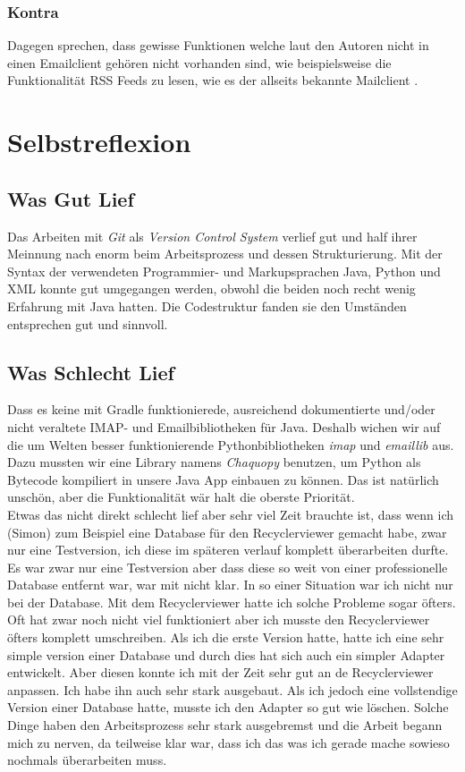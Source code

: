 \documentclass[a4paper,11pt]{article}
\begin{document}
\subsubsection{Kontra}
Dagegen sprechen, dass gewisse Funktionen welche laut den Autoren nicht in einen Emailclient gehören nicht vorhanden sind, wie beispielsweise die Funktionalität RSS Feeds zu lesen, wie es der allseits bekannte Mailclient \cite{thunderbird}.

\section{Selbstreflexion}

\subsection{Was Gut Lief}
Das Arbeiten mit \textit{Git} als \textit{Version Control System} verlief gut und half ihrer Meinnung nach enorm beim Arbeitsprozess und dessen Strukturierung. Mit der Syntax der verwendeten Programmier- und Markupsprachen Java, Python und XML konnte gut umgegangen werden, obwohl die beiden noch recht wenig Erfahrung mit Java hatten. Die Codestruktur fanden sie den Umständen entsprechen gut und sinnvoll.
\subsection{Was Schlecht Lief}
Dass es keine mit Gradle funktionierede, ausreichend dokumentierte und/oder nicht veraltete IMAP- und Emailbibliotheken für Java. Deshalb wichen wir auf die um Welten besser funktionierende Pythonbibliotheken \textit{imap} und \textit{emaillib} aus. Dazu mussten wir eine Library namens \textit{Chaquopy} benutzen, um Python als Bytecode kompiliert in unsere Java App einbauen zu können. Das ist natürlich unschön, aber die Funktionalität wär halt die oberste Priorität.\\

Etwas das nicht direkt schlecht lief aber sehr viel Zeit brauchte ist, dass wenn ich (Simon) zum Beispiel eine Database für den Recyclerviewer gemacht habe, zwar nur eine Testversion, 
ich diese im späteren verlauf komplett überarbeiten durfte. Es war zwar nur eine Testversion aber dass diese so weit von einer professionelle Database entfernt war, war mit nicht klar. 
In so einer Situation war ich nicht nur bei der Database. Mit dem Recyclerviewer hatte ich solche Probleme sogar öfters. Oft hat zwar noch nicht viel funktioniert aber ich musste den Recyclerviewer
öfters komplett umschreiben. Als ich die erste Version hatte, hatte ich eine sehr simple version einer Database und durch dies hat sich auch ein simpler Adapter entwickelt. 
Aber diesen konnte ich mit der Zeit sehr gut an de Recyclerviewer anpassen. Ich habe ihn auch sehr stark ausgebaut. Als ich jedoch eine vollstendige Version einer Database hatte, musste ich den 
Adapter so gut wie löschen. Solche Dinge haben den Arbeitsprozess sehr stark ausgebremst und die Arbeit begann mich zu nerven, da teilweise klar war, dass ich das was ich gerade
mache sowieso nochmals überarbeiten muss. 
\end{document}
